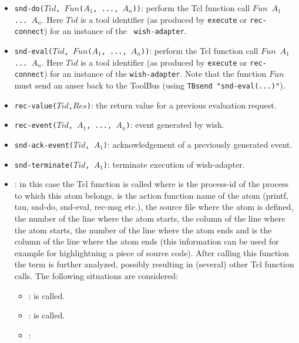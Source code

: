 \begin{itemize}
\item {\tt snd-do($Tid$, $Fun$($A_1$, ..., $A_n$))}: perform the Tcl function
call
{\tt $Fun$ $A_1$  ... $A_n$}. Here $Tid$ is a tool identifier
(as produced by {\tt execute} or {\tt rec-connect}) for an instance of the {\tt
wish-adapter}.
\item {\tt snd-eval($Tid$, $Fun$($A_1$, ..., $A_n$))}: perform the Tcl function call
{\tt $Fun$ $A_1$  ... $A_n$}. Here $Tid$ is a tool identifier 
(as produced by {\tt execute} or {\tt rec-connect}) for an instance of the {\tt wish-adapter}.
Note that the function {\tt $Fun$} must send an anser back to the
ToolBus (using {\tt TBsend "snd-eval(...)"}).
\item {\tt rec-value($Tid$,$Res$)}: the return value for a previous evaluation request.
\item {\tt rec-event($Tid$, $A_1$, ..., $A_n$)}: event generated by wish.
\item {\tt snd-ack-event($Tid$, $A_1$)}: acknowledgement of
a previously generated event.
\item {\tt snd-terminate($Tid$, $A_1$)}: terminate execution of wish-adapter.
\item {}: in this case the Tcl
  function 
  is called where  is the process-id of the process to
  which this atom belongs,  is the action function name of
  the atom (printf, tau, snd-do, snd-eval, rec-msg etc.),  the
  source file where the atom is defined,  the number of
  the line where the atom starts,  the column of the
  line where the atom starts,  the number of the line
  where the atom ends and  is the column of the line where
  the atom ends (this information can be used for example for
  highlightning a piece of source code). 
  After calling this function the term is further analyzed,
  possibly resulting in (several) other Tcl function
  calls. The following situations are considered:
  \begin{itemize}
  \item {}:
     is
    called.
  \item {}:  is called.
  \item {}:

\end{itemize}
\end{itemize}
